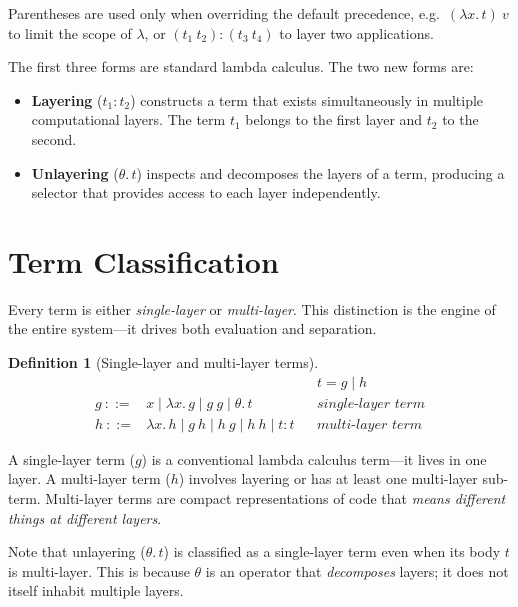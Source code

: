 \documentclass[11pt,letterpaper]{article}
\theoremstyle{definition}
\newtheorem{definition}{Definition}[section]
\begin{document}
\noindent Parentheses are used only when overriding the default precedence,
e.g.\ $(\lambda x.\,t)\ v$ to limit the scope of $\lambda$, or
$(t_1\ t_2){:}(t_3\ t_4)$ to layer two applications.

The first three forms are standard lambda calculus. The two new forms are:

\begin{itemize}
\item \textbf{Layering} ($t_1{:}t_2$) constructs a term that exists
  simultaneously in multiple computational layers. The term $t_1$ belongs to
  the first layer and $t_2$ to the second.

\item \textbf{Unlayering} ($\theta.\,t$) inspects and decomposes the layers
  of a term, producing a selector that provides access to each layer
  independently.
\end{itemize}


\section{Term Classification}\label{sec:classification}

Every term is either \emph{single-layer} or \emph{multi-layer}. This
distinction is the engine of the entire system---it drives both evaluation
and separation.

\begin{definition}[Single-layer and multi-layer terms]
\label{def:layers}
$$
\begin{array}{rcll}
  & & & t = g \mid h \\[4pt]
g \ ::= & x \mid \lambda x.\,g \mid g\ g \mid \theta.\,t
  & & \textit{single-layer term} \\
h \ ::= & \lambda x.\,h \mid g\ h \mid h\ g \mid h\ h \mid t{:}t
  & & \textit{multi-layer term}
\end{array}
$$
\end{definition}

A single-layer term ($g$) is a conventional lambda calculus term---it lives
in one layer. A multi-layer term ($h$) involves layering or has at least one
multi-layer sub-term. Multi-layer terms are compact representations of code
that \emph{means different things at different layers}.

Note that unlayering ($\theta.\,t$) is classified as a single-layer term even
when its body $t$ is multi-layer. This is because $\theta$ is an operator that
\emph{decomposes} layers; it does not itself inhabit multiple layers.
\end{document}
